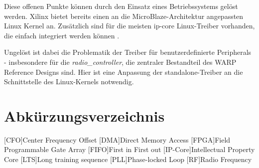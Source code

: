 \documentclass[ngerman,]{scrartcl}
\begin{document}
Diese offenen Punkte können durch den Einsatz eines Betriebssystems
gelöst werden. Xilinx bietet bereits einen an die MicroBlaze-Architektur
angepassten Linux Kernel \autocite{xilinx-microblaze} an. Zusätzlich
sind für die meisten \ac{ip-core} Linux-Treiber vorhanden, die einfach
integriert werden können \autocite{xilinx-linux-drivers}.

Ungelöst ist dabei die Problematik der Treiber für benutzerdefinierte
Peripherals - insbesondere für die \emph{radio\_controller}, die
zentraler Bestandteil des WARP Reference Designs sind. Hier ist eine
Anpassung der standalone-Treiber an die Schnittstelle des Linux-Kernels
notwendig.

\printbibliography

\section*{Abkürzungsverzeichnis}\begin{acronym}[ip-core]
[CFO]{Center Frequency Offset}
[DMA]{Direct Memory Access}
[FPGA]{Field Programmable Gate Array}
[FIFO]{First in First out}
[IP-Core]{Intellectual Property Core}
[LTS]{Long training sequence}
[PLL]{Phase-locked Loop}
[RF]{Radio Frequency}
\end{acronym}
\end{document}
